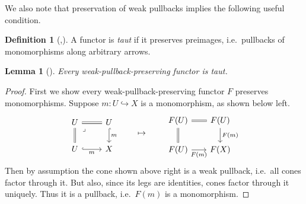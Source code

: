 \documentclass[11pt, oneside, article]{memoir}
\theoremstyle{plain}
\newtheorem{lemma}[theorem]{Lemma}
\theoremstyle{definition}
\newtheorem{definition}[def]{Definition}
\theoremstyle{remark}
\newcommand{\xU}{U}
\newcommand{\xX}{X}
\begin{document}
We also note that preservation of weak pullbacks implies the following
useful condition.

\begin{definition}[\cite{manes},\cite{pare:taut}]
  A functor is \emph{taut} if it preserves preimages, i.e.\ pullbacks
  of monomorphisms along arbitrary arrows.
\end{definition}

\begin{lemma}[{\cite[Lemma 1.2]{johnstone-power-tsujishita-watanabe-worrell}}]\label{lem:weaktaut}
  Every weak-pullback-preserving functor is taut.
\end{lemma}
\begin{proof}
  First we show every weak-pullback-preserving functor $F$ preserves
  monomorphisms. Suppose $m \colon \xU \hookrightarrow \xX$ is a
  monomorphism, as shown below left.
  \[
    \begin{tikzcd}
      \xU & \xU \\
      \xU & \xX
      \arrow[equals, from=1-1, to=1-2]
      \arrow[equals, from=1-1, to=2-1]
      \arrow["\lrcorner"{anchor=center, pos=0.125}, draw=none, from=1-1, to=2-2]
      \arrow["m", hook, from=1-2, to=2-2]
      \arrow["m"', hook, from=2-1, to=2-2]
    \end{tikzcd}
    \qquad\mapsto\qquad
    \begin{tikzcd}[column sep=18pt]
      {F(\xU)} & {F(\xU)} \\
      {F(\xU)} & {F(\xX)}
      \arrow[equals, from=1-1, to=1-2]
      \arrow[equals, from=1-1, to=2-1]
      \arrow["{F(m)}", from=1-2, to=2-2]
      \arrow["{F(m)}"', from=2-1, to=2-2]
    \end{tikzcd}\]
  Then by assumption the cone shown above right is
  a weak pullback, i.e.\ all cones factor through it. But also, since
  its legs are identities, cones factor through it
  uniquely. Thus it is a pullback, i.e.\ $F(m)$ is a monomorphism.


\end{proof}
\end{document}
